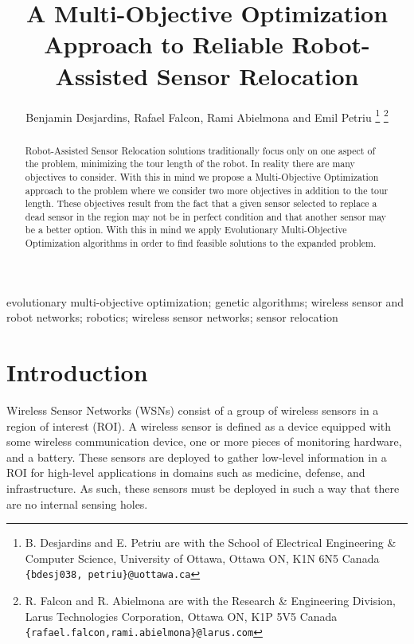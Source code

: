 \documentclass[conference]{IEEEtran}
\begin{document}
\title{A Multi-Objective Optimization Approach to Reliable Robot-Assisted Sensor Relocation}

\author{Benjamin Desjardins, Rafael Falcon, Rami Abielmona and Emil Petriu
\thanks{B. Desjardins and E. Petriu are with the School of Electrical Engineering \& Computer Science,
        University of Ottawa, Ottawa ON, K1N 6N5 Canada
        {\tt\small \{bdesj038, petriu\}@uottawa.ca}}%
\thanks{R. Falcon and R. Abielmona are with the Research \& Engineering Division,
        Larus Technologies Corporation, Ottawa ON, K1P 5V5 Canada
        {\tt\small \{rafael.falcon,rami.abielmona\}@larus.com}}%
			  }%

\vspace{-1cm}
\maketitle

\begin{abstract}
Robot-Assisted Sensor Relocation solutions traditionally focus only on one aspect of the problem, minimizing the tour length of the robot. In reality there are many objectives to consider. With this in mind we propose a Multi-Objective Optimization approach to the problem where we consider two more objectives in addition to the tour length. These objectives result from the fact that a given sensor selected to replace a dead sensor in the region may not be in perfect condition and that another sensor may be a better option. With this in mind we apply Evolutionary Multi-Objective Optimization algorithms in order to find feasible solutions to the expanded problem.
\end{abstract}

\vspace{0.25cm}

\noindent \begin{IEEEkeywords}
evolutionary multi-objective optimization; genetic algorithms; wireless sensor and robot networks; robotics; wireless sensor networks; sensor relocation
\end{IEEEkeywords}

\IEEEpeerreviewmaketitle

\section{Introduction}
\label{sec:Intro}

Wireless Sensor Networks (WSNs) consist of a group of wireless sensors in a region of interest (ROI). A wireless sensor is defined as a device equipped with some wireless communication device, one or more pieces of monitoring hardware, and a battery. These sensors are deployed to gather low-level information in a ROI for high-level applications in domains such as medicine, defense, and infrastructure. As such, these sensors must be deployed in such a way that there are no internal sensing holes.
\end{document}
